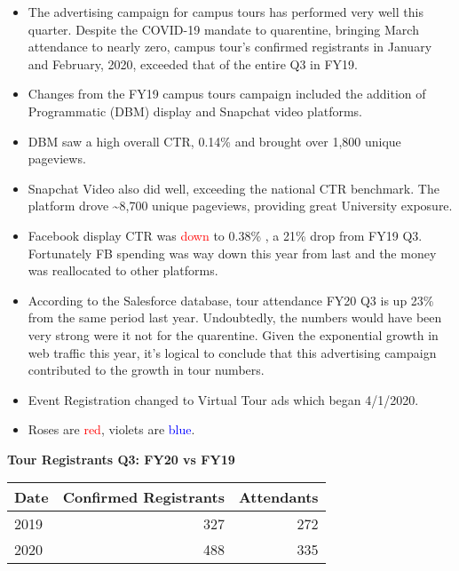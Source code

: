 \documentclass[
  11pt,
]{article}
\begin{document}
\begin{itemize}
\item
  The advertising campaign for campus tours has performed very well this
  quarter. Despite the COVID-19 mandate to quarentine, bringing March
  attendance to nearly zero, campus tour's confirmed registrants in
  January and February, 2020, exceeded that of the entire Q3 in FY19.
\item
  Changes from the FY19 campus tours campaign included the addition of
  Programmatic (DBM) display and Snapchat video platforms.
\item
  DBM saw a high overall CTR, 0.14\% and brought over 1,800 unique
  pageviews.
\item
  Snapchat Video also did well, exceeding the national CTR benchmark.
  The platform drove \textasciitilde8,700 unique pageviews, providing
  great University exposure.
\item
  Facebook display CTR was \textcolor{red}{down} to 0.38\% , a 21\% drop
  from FY19 Q3. Fortunately FB spending was way down this year from last
  and the money was reallocated to other platforms.
\item
  According to the Salesforce database, tour attendance FY20 Q3 is up
  23\% from the same period last year. Undoubtedly, the numbers would
  have been very strong were it not for the quarentine. Given the
  exponential growth in web traffic this year, it's logical to conclude
  that this advertising campaign contributed to the growth in tour
  numbers.
\item
  Event Registration changed to Virtual Tour ads which began 4/1/2020.
\item
  Roses are \textcolor{red}{red}, violets are \textcolor{blue}{blue}.
\end{itemize}

\textbf{Tour Registrants Q3: FY20 vs FY19}

\begin{tabular}{l|r|r}
\hline
Date & Confirmed Registrants & Attendants\\
\hline
2019 & 327 & 272\\
\hline
2020 & 488 & 335\\
\hline
\end{tabular}
\end{document}
